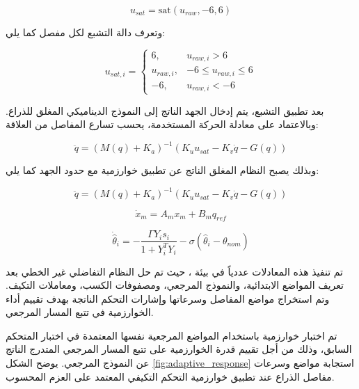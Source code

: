 \begin{equation}
u_{sat}
=
\mathrm{sat}
\left(
u_{raw},-6,6
\right)
\label{eq:actc_saturated_voltage}
\end{equation}

وتعرف دالة التشبع لكل مفصل كما يلي:

\begin{equation}
u_{sat,i}
=
\begin{cases}
6, & u_{raw,i}>6\\
u_{raw,i}, & -6 \leq u_{raw,i} \leq 6\\
-6, & u_{raw,i}<-6
\end{cases}
\label{eq:actc_saturation_function}
\end{equation}

بعد تطبيق التشبع، يتم إدخال الجهد الناتج إلى النموذج الديناميكي المغلق للذراع. وبالاعتماد على معادلة الحركة المستخدمة، يحسب تسارع المفاصل من العلاقة:

\begin{equation}
\ddot{q}
=
\left(M(q)+K_a\right)^{-1}
\left(
K_u u_{sat}
-
K_v\dot{q}
-
G(q)
\right)
\label{eq:actc_closed_loop_acceleration}
\end{equation}

وبذلك يصبح النظام المغلق الناتج عن تطبيق خوارزمية  مع حدود الجهد كما يلي:

\begin{equation}
\ddot{q}
=
\left(M(q)+K_a\right)^{-1}
\left(
K_u u_{sat}
-
K_v\dot{q}
-
G(q)
\right)
\label{eq:actc_state_ddq}
\end{equation}

\begin{equation}
\dot{x}_m
=
A_m x_m+B_m q_{ref}
\label{eq:actc_state_reference_model}
\end{equation}

\begin{equation}
\dot{\hat{\theta}}_i
=
-
\frac{\Gamma Y_i s_i}{1+Y_i^{T}Y_i}
-
\sigma
\left(
\hat{\theta}_i-\theta_{nom}
\right)
\label{eq:actc_state_theta_dot}
\end{equation}

تم تنفيذ هذه المعادلات عددياً في بيئة ، حيث تم حل النظام التفاضلي غير الخطي بعد تعريف المواضع الابتدائية، والنموذج المرجعي، ومصفوفات الكسب، ومعاملات التكيف. وتم استخراج مواضع المفاصل وسرعاتها وإشارات التحكم الناتجة بهدف تقييم أداء الخوارزمية في تتبع المسار المرجعي.


تم اختبار خوارزمية  باستخدام المواضع المرجعية نفسها المعتمدة في اختبار المتحكم السابق، وذلك من أجل تقييم قدرة الخوارزمية على تتبع المسار المرجعي المتدرج الناتج عن النموذج المرجعي. يوضح الشكل \ref{fig:adaptive_response} استجابة مواضع وسرعات مفاصل الذراع عند تطبيق خوارزمية التحكم التكيفي المعتمد على العزم المحسوب.

